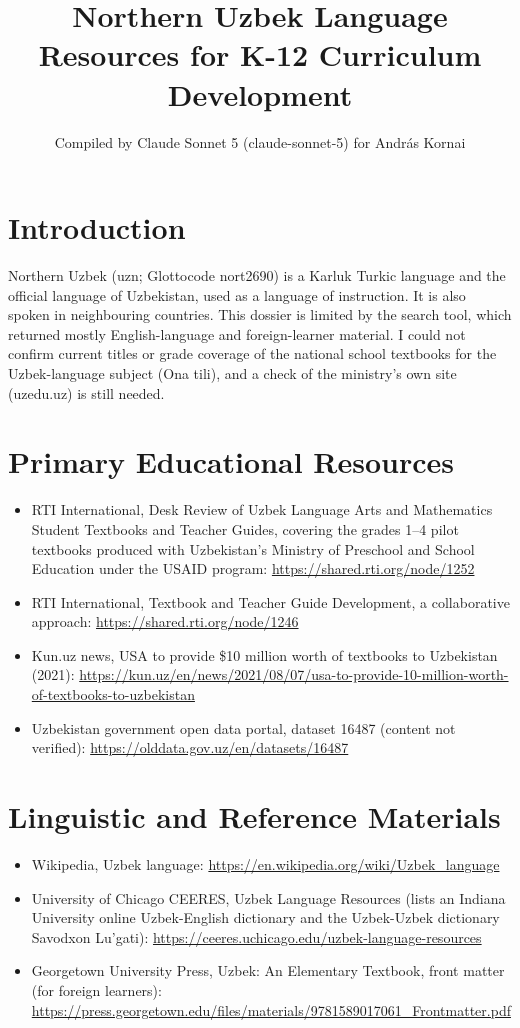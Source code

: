 \documentclass[12pt]{article}
\title{Northern Uzbek Language Resources for K-12 Curriculum Development}
\author{Compiled by Claude Sonnet 5 (claude-sonnet-5) for Andr\'as Kornai}
\date{}
\begin{document}
\maketitle

\section{Introduction}
Northern Uzbek (uzn; Glottocode nort2690) is a Karluk Turkic language and the official language of Uzbekistan, used as a language of instruction. It is also spoken in neighbouring countries. This dossier is limited by the search tool, which returned mostly English-language and foreign-learner material. I could not confirm current titles or grade coverage of the national school textbooks for the Uzbek-language subject (Ona tili), and a check of the ministry's own site (uzedu.uz) is still needed.

\section{Primary Educational Resources}
\begin{itemize}
\item RTI International, Desk Review of Uzbek Language Arts and Mathematics Student Textbooks and Teacher Guides, covering the grades 1--4 pilot textbooks produced with Uzbekistan's Ministry of Preschool and School Education under the USAID program: \url{https://shared.rti.org/node/1252}
\item RTI International, Textbook and Teacher Guide Development, a collaborative approach: \url{https://shared.rti.org/node/1246}
\item Kun.uz news, USA to provide \$10 million worth of textbooks to Uzbekistan (2021): \url{https://kun.uz/en/news/2021/08/07/usa-to-provide-10-million-worth-of-textbooks-to-uzbekistan}
\item Uzbekistan government open data portal, dataset 16487 (content not verified): \url{https://olddata.gov.uz/en/datasets/16487}
\end{itemize}

\section{Linguistic and Reference Materials}
\begin{itemize}
\item Wikipedia, Uzbek language: \url{https://en.wikipedia.org/wiki/Uzbek_language}
\item University of Chicago CEERES, Uzbek Language Resources (lists an Indiana University online Uzbek-English dictionary and the Uzbek-Uzbek dictionary Savodxon Lu'gati): \url{https://ceeres.uchicago.edu/uzbek-language-resources}
\item Georgetown University Press, Uzbek: An Elementary Textbook, front matter (for foreign learners): \url{https://press.georgetown.edu/files/materials/9781589017061_Frontmatter.pdf}
\end{itemize}
\end{document}
